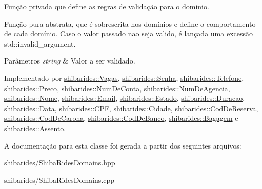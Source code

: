 Função privada que define as regras de validação para o dominio. 

Função pura abstrata, que é sobrescrita nos domínios e define o comportamento de cada domínio. Caso o valor passado nao seja valido, é lançada uma excessão std\+::invalid\+\_\+argument.


\begin{DoxyParams}{Parâmetros}
{\em string} & Valor a ser validado. \\
\hline
\end{DoxyParams}


Implementado por \hyperlink{classshibarides_1_1Vagas_ae5f73c52819397524b0334d9e609d296}{shibarides\+::\+Vagas}, \hyperlink{classshibarides_1_1Senha_a733550b46c79a95df9f5f4163f0be923}{shibarides\+::\+Senha}, \hyperlink{classshibarides_1_1Telefone_aa798f740a30faef8d2599950284ded33}{shibarides\+::\+Telefone}, \hyperlink{classshibarides_1_1Preco_ae57d286adf4db4b1132001f8736892f7}{shibarides\+::\+Preco}, \hyperlink{classshibarides_1_1NumDeConta_afe1c1bfd98ca97d59b521a6e7ac9d5ef}{shibarides\+::\+Num\+De\+Conta}, \hyperlink{classshibarides_1_1NumDeAgencia_a4bf7dd9204aff60838faf4f2362d8c3b}{shibarides\+::\+Num\+De\+Agencia}, \hyperlink{classshibarides_1_1Nome_aae6c1656422424a675e79a03a7ca534e}{shibarides\+::\+Nome}, \hyperlink{classshibarides_1_1Email_a0589d5dedd6e072f454391cd2e2873ee}{shibarides\+::\+Email}, \hyperlink{classshibarides_1_1Estado_a87dff745c1b1f487eae4bd4461e8a1ef}{shibarides\+::\+Estado}, \hyperlink{classshibarides_1_1Duracao_aa64196edbfe284120c3d498e20212a99}{shibarides\+::\+Duracao}, \hyperlink{classshibarides_1_1Data_a6240717eb60d01a7ab0c12336685c862}{shibarides\+::\+Data}, \hyperlink{classshibarides_1_1CPF_a0764894456e73dde8130a07f95b68f08}{shibarides\+::\+C\+PF}, \hyperlink{classshibarides_1_1Cidade_a2a2455d16a0d316ebcc57c4389e1a0b0}{shibarides\+::\+Cidade}, \hyperlink{classshibarides_1_1CodDeReserva_a595a667ca295b1adc5eedefd773d8027}{shibarides\+::\+Cod\+De\+Reserva}, \hyperlink{classshibarides_1_1CodDeCarona_a2713cdc938576b30a6f7e59ddc67a848}{shibarides\+::\+Cod\+De\+Carona}, \hyperlink{classshibarides_1_1CodDeBanco_a111bd50227f559d36010ddbf7bee1107}{shibarides\+::\+Cod\+De\+Banco}, \hyperlink{classshibarides_1_1Bagagem_aad85c0b035f3f3202130160edc35d41d}{shibarides\+::\+Bagagem} e \hyperlink{classshibarides_1_1Assento_a8a2099562808c49caff59569bcb977c3}{shibarides\+::\+Assento}.



A documentação para esta classe foi gerada a partir dos seguintes arquivos\+:\begin{DoxyCompactItemize}
\item 
shibarides/Shiba\+Rides\+Domains.\+hpp\item 
shibarides/Shiba\+Rides\+Domains.\+cpp\end{DoxyCompactItemize}
